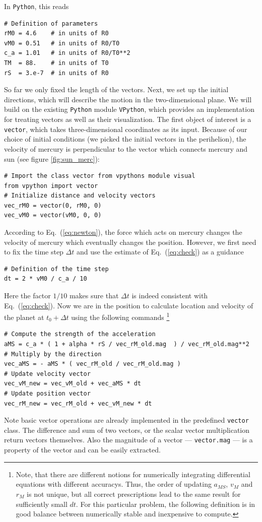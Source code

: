 \documentclass[12pt, UK english]{iopart}
\newcommand{\python}[0]{\texttt{Python}}
\begin{document}
In \python{}, this reads
\begin{lstlisting}
# Definition of parameters
rM0 = 4.6    # in units of R0
vM0 = 0.51   # in units of R0/T0
c_a = 1.01   # in units of R0/T0**2
TM  = 88.    # in units of T0
rS  = 3.e-7  # in units of R0
\end{lstlisting}
So far we only fixed the length of the vectors.
Next, we set up the initial directions, which will describe the motion in the two-dimensional plane.  We will build on the existing \python{} module \texttt{VPython}, which provides an implementation for treating vectors as well as their visualization.
The first object of interest is a \texttt{vector}, which takes three-dimensional coordinates as its input.
Because of our choice of initial conditions (we picked the initial vectors in the perihelion), the velocity of mercury is perpendicular to the vector which connects mercury and sun (see figure \ref{fig:sun_merc}):
\begin{lstlisting}
# Import the class vector from vpythons module visual
from vpython import vector
# Initialize distance and velocity vectors
vec_rM0 = vector(0, rM0, 0)
vec_vM0 = vector(vM0, 0, 0)
\end{lstlisting}
According to Eq.~(\ref{eq:newton}), the force which acts on mercury changes the velocity of mercury which eventually changes the position.
However, we first need to fix the time step $\Delta t$ and use the estimate of Eq.~(\ref{eq:check}) as a guidance
\begin{lstlisting}
# Definition of the time step
dt = 2 * vM0 / c_a / 10
\end{lstlisting}
Here the factor $1/10$ makes sure that $\Delta t$ is indeed consistent with Eq.~(\ref{eq:check}).
Now we are in the position to calculate location and velocity of the planet at $t_0+\Delta t$ using the following commands \footnote{%
	Note, that there are different notions for numerically integrating differential equations with different accuracys.
	Thus, the order of updating $a_{MS}$, $v_M$ and $r_M$ is not unique, but all correct prescriptions lead to the same result for sufficiently small $dt$.
	For this particular problem, the following definition is in good balance between numerically stable and inexpensive to compute.
}%
\begin{lstlisting}
# Compute the strength of the acceleration
aMS = c_a * ( 1 + alpha * rS / vec_rM_old.mag  ) / vec_rM_old.mag**2
# Multiply by the direction
vec_aMS = - aMS * ( vec_rM_old / vec_rM_old.mag )
# Update velocity vector
vec_vM_new = vec_vM_old + vec_aMS * dt
# Update position vector
vec_rM_new = vec_rM_old + vec_vM_new * dt
\end{lstlisting}
Note basic vector operations are already implemented in the predefined \texttt{vector} class.
The difference and sum of two vectors, or the scalar vector multiplication return vectors themselves.
Also the magnitude of a vector --- \texttt{vector.mag} --- is a property of the vector and can be easily extracted.
\end{document}
